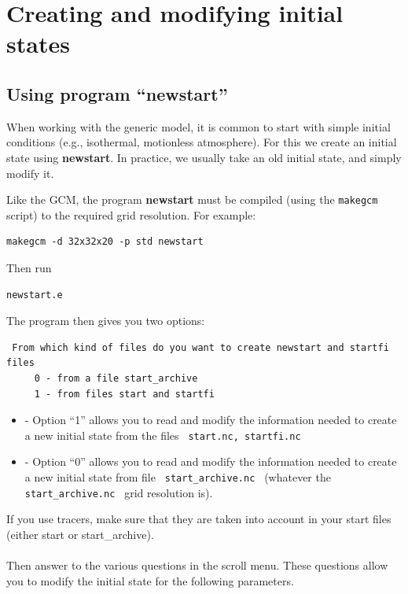 \section{Creating and modifying initial states}

\label{sc:newstart}

\subsection{Using program ``newstart''}

When working with the generic model, it is common to start with simple initial conditions (e.g., isothermal, motionless atmosphere). For this we create an initial state using {\bf newstart}. In practice, we usually take an old initial state, and simply modify it.

Like the GCM, the program {\bf newstart} must be compiled (using the {\tt makegcm} script) to the required grid resolution.
For example:
\begin{verbatim}
makegcm -d 32x32x20 -p std newstart
\end{verbatim}

Then run

\begin{verbatim}
newstart.e
\end{verbatim}

The program then gives you two options:

\begin{verbatim}
 From which kind of files do you want to create newstart and startfi files
     0 - from a file start_archive
     1 - from files start and startfi
\end{verbatim}

\begin{itemize}
\item{-} Option ``1'' allows you to read and modify the information needed
to create a new initial state  from the files
\verb+ start.nc, startfi.nc +
\item{-} Option ``0'' allows you to read and modify the information needed to
create a new initial state from file
\verb+ start_archive.nc + (whatever the \verb+ start_archive.nc +
grid resolution is).\\
\end{itemize}
If you use tracers, make sure that they are taken into account in your
start files (either start or start\_archive).\\ \\
Then answer to the various questions in the scroll menu.
These questions allow you to modify the initial state for the following
parameters.\\


